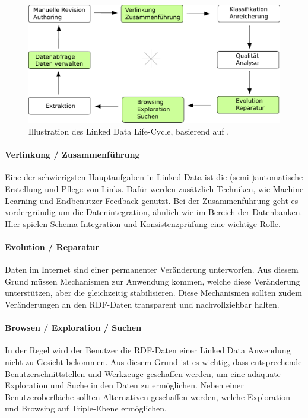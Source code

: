 \documentclass[11pt]{article}
\begin{document}
%
%
\begin{figure}[h!]
    \centering
    \includegraphics[width=12cm]{Statistics/LinkedDataLifeCycle.pdf}
    \caption{\small{Illustration des Linked Data Life-Cycle, basierend auf \cite[S. 3]{LINKEDDATA-LIFECYCLE}}.}
    \label{fig:Statistics_LinkedDataLifeCycle}
\end{figure}

\paragraph{Verlinkung / Zusammenführung}

Eine der schwierigsten Hauptaufgaben in Linked Data ist die (semi-)automatische Erstellung und Pflege von Links. Dafür werden zusätzlich Techniken, wie Machine Learning und Endbenutzer-Feedback genutzt. Bei der Zusammenführung geht es vordergründig um die Datenintegration, ähnlich wie im Bereich der Datenbanken. Hier spielen Schema-Integration und Konsistenzprüfung eine wichtige Rolle.

\paragraph{Evolution / Reparatur} 

Daten im Internet sind einer permanenter Veränderung unterworfen. Aus diesem Grund müssen Mechanismen zur Anwendung kommen, welche diese Veränderung unterstützen, aber die gleichzeitig stabilisieren. Diese Mechanismen sollten zudem Veränderungen an den RDF-Daten transparent und nachvollziehbar halten.

\paragraph{Browsen / Exploration / Suchen} 

In der Regel wird der Benutzer die RDF-Daten einer Linked Data Anwendung nicht zu Gesicht bekommen. Aus diesem Grund ist es wichtig, dass entsprechende Benutzerschnittstellen und Werkzeuge geschaffen werden, um eine adäquate Exploration und Suche in den Daten zu ermöglichen. Neben einer Benutzeroberfläche sollten Alternativen geschaffen werden, welche Exploration und Browsing auf Triple-Ebene ermöglichen.
\end{document}
